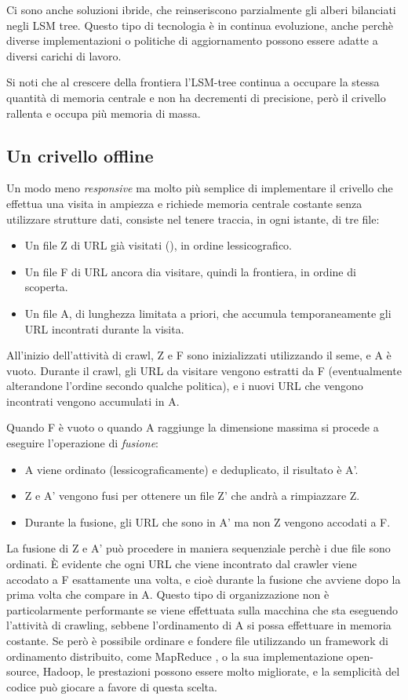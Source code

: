 Ci sono anche soluzioni ibride, che reinseriscono parzialmente gli alberi bilanciati negli LSM tree. Questo tipo di tecnologia è in continua evoluzione, anche perchè diverse implementazioni o politiche di aggiornamento possono essere adatte a diversi carichi di lavoro.

Si noti che al crescere della frontiera l'LSM-tree continua a occupare la stessa quantità di memoria centrale e non ha decrementi di precisione, però il crivello rallenta e occupa più memoria di massa.
\subsection{Un crivello offline}
Un modo meno \textit{responsive} ma molto più semplice di implementare il crivello che effettua una visita in ampiezza e richiede memoria centrale costante senza utilizzare strutture dati, consiste nel tenere traccia, in ogni istante, di tre file:
\begin{itemize}
    \item Un file Z di URL già visitati (), in ordine lessicografico.
    \item Un file F di URL ancora dia visitare, quindi la frontiera, in ordine di scoperta.
    \item Un file A, di lunghezza limitata a priori, che accumula temporaneamente gli URL incontrati durante la visita.
\end{itemize}
All'inizio dell'attività di crawl, Z e F sono inizializzati utilizzando il seme, e A è vuoto. Durante il crawl, gli URL da visitare vengono estratti da F (eventualmente alterandone l'ordine secondo qualche politica), e i nuovi URL che vengono incontrati vengono accumulati in A.

Quando F è vuoto o quando A raggiunge la dimensione massima si procede a eseguire l'operazione di \textit{fusione}:
\begin{itemize}
    \item A viene ordinato (lessicograficamente) e deduplicato, il risultato è A'.
    \item Z e A' vengono fusi per ottenere un file Z' che andrà a rimpiazzare Z.
    \item Durante la fusione, gli URL che sono in A' ma non Z vengono accodati a F.
\end{itemize}
La fusione di Z e A' può procedere in maniera sequenziale perchè i due file sono ordinati. È evidente che ogni URL che viene incontrato dal crawler viene accodato a F esattamente una volta, e cioè durante la fusione che avviene dopo la prima volta che compare in A.
Questo tipo di organizzazione non è particolarmente performante se viene effettuata sulla macchina che sta eseguendo l'attività di crawling, sebbene l'ordinamento di A si possa effettuare in memoria costante. Se però è possibile ordinare e fondere file utilizzando un framework di ordinamento distribuito, come MapReduce \cite{MapReduce}, o la sua implementazione open-source, Hadoop, le prestazioni possono essere molto migliorate, e la semplicità del codice può giocare a favore di questa scelta.

